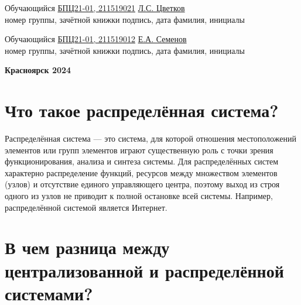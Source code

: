 \documentclass[14pt]{extarticle} %
\begin{document}
\begin{center}
        \begin{flushleft}
            {Обучающийся  \uline{ БПЦ21-01, 211519021}} \hspace{1.25cm} \uline{\hspace{2.8cm}} \uline{\hspace{0.43cm}Л.С. Цветков\hspace{0.43cm}} \\
         \footnotesize \hspace{3cm} {номер группы, зачётной книжки}{\hspace{1.5cm} подпись, дата \hspace{0.55cm} фамилия, инициалы}
        \end{flushleft}
        \begin{flushleft}
            {Обучающийся  \uline{ БПЦ21-01, 211519012}} \hspace{1.25cm} \uline{\hspace{2.8cm}} \uline{\hspace{0.43cm}Е.А. Семенов\hspace{0.43cm}} \\
         \footnotesize \hspace{3cm} {номер группы, зачётной книжки}{\hspace{1.5cm} подпись, дата \hspace{0.55cm} фамилия, инициалы}
        \end{flushleft}
        \vspace{1cm}
        \textbf{Красноярск 2024}
            
        
    \end{center}

\newpage
\tableofcontents %
 \thispagestyle{empty}  
\newpage

\section{Что такое распределённая система?} \label{sec:first}
Распределённая система — это система, для которой отношения местоположений элементов или групп элементов играют существенную роль с точки зрения функционирования, анализа и синтеза системы.
Для распределённых систем характерно распределение функций, ресурсов между множеством элементов (узлов) и отсутствие единого управляющего центра, поэтому выход из строя одного из узлов не приводит к полной остановке всей системы. Например, распределённой системой является Интернет.

\section{В чем разница между централизованной и распределённой системами?} \label{sec:second}
\end{document}
